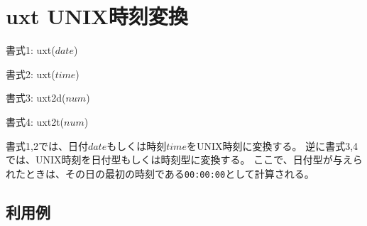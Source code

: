 
%

\section{uxt UNIX時刻変換\label{sect:uxt}}

書式1: uxt($date$)

書式2: uxt($time$)

書式3: uxt2d($num$)

書式4: uxt2t($num$)

書式1,2では、日付$date$もしくは時刻$time$をUNIX時刻に変換する。
逆に書式3,4では、UNIX時刻を日付型もしくは時刻型に変換する。
ここで、日付型が与えられたときは、その日の最初の時刻である\verb|00:00:00|として計算される。

\subsection*{利用例}


%

